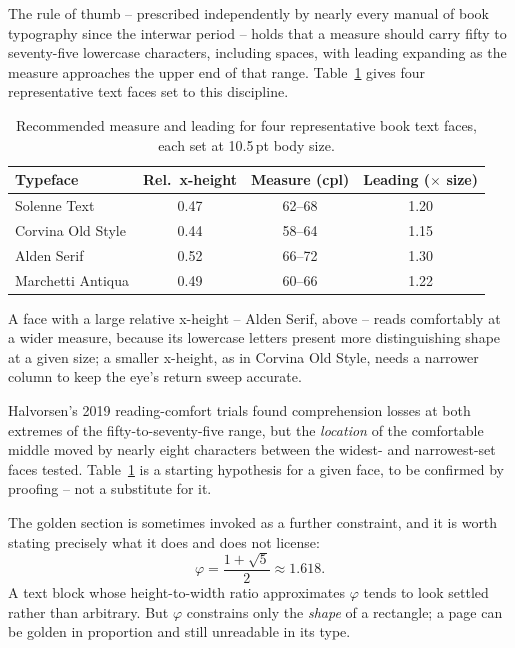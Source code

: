 \documentclass[11pt,paper=a4,footinclude=true,headinclude=true,open=any]{scrbook}
\begin{document}
The rule of thumb -- prescribed independently by nearly every manual of book typography since the interwar period -- holds that a measure should carry fifty to seventy-five lowercase characters, including spaces, with leading expanding as the measure approaches the upper end of that range. Table~\ref{tab:specimens} gives four representative text faces set to this discipline.

\begin{table}[h]
\centering
\small
\begin{tabular}{@{}lccc@{}}
\toprule
Typeface & Rel.\ x-height & Measure (cpl) & Leading ($\times$ size) \\
\midrule
Solenne Text & 0.47 & 62--68 & 1.20 \\
Corvina Old Style & 0.44 & 58--64 & 1.15 \\
Alden Serif & 0.52 & 66--72 & 1.30 \\
Marchetti Antiqua & 0.49 & 60--66 & 1.22 \\
\bottomrule
\end{tabular}
\caption{Recommended measure and leading for four representative book text faces, each set at 10.5\,pt body size.}
\label{tab:specimens}
\end{table}

A face with a large relative x-height -- Alden Serif, above -- reads comfortably at a wider measure, because its lowercase letters present more distinguishing shape at a given size; a smaller x-height, as in Corvina Old Style, needs a narrower column to keep the eye's return sweep accurate.

\begingroup
\small
\begin{tcolorbox}[title=Editorial Note]
Halvorsen's 2019 reading-comfort trials found comprehension losses at both extremes of the fifty-to-seventy-five range, but the \emph{location} of the comfortable middle moved by nearly eight characters between the widest- and narrowest-set faces tested. Table~\ref{tab:specimens} is a starting hypothesis for a given face, to be confirmed by proofing -- not a substitute for it.
\end{tcolorbox}
\endgroup

The golden section is sometimes invoked as a further constraint, and it is worth stating precisely what it does and does not license:
\[
\varphi = \frac{1+\sqrt{5}}{2} \approx 1.618.
\]
A text block whose height-to-width ratio approximates $\varphi$ tends to look settled rather than arbitrary. But $\varphi$ constrains only the \emph{shape} of a rectangle; a page can be golden in proportion and still unreadable in its type.
\end{document}
